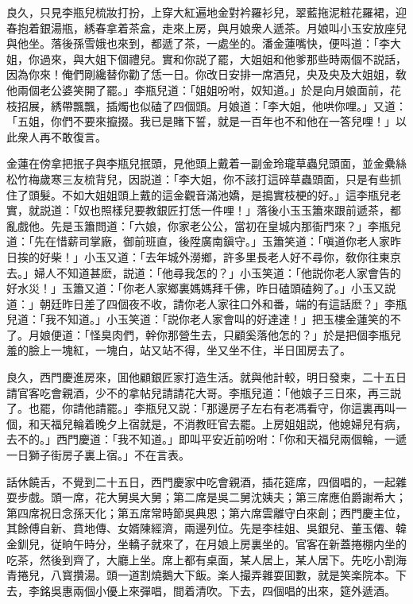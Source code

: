 良久，只見李瓶兒梳妝打扮，上穿大紅遍地金對衿羅衫兒，翠藍拖泥粧花羅裙，迎春抱着銀湯瓶，綉春拿着茶盒，走來上房，與月娘衆人遞茶。月娘叫小玉安放座兒與他坐。落後孫雪娥也來到，都遞了茶，一處坐的。潘金蓮嘴快，便呌道：「李大姐，你過來，與大姐下個禮兒。實和你説了罷，大姐姐和他爹那些時兩個不説話，因為你來！俺們剛纔替你勸了恁一日。你改日安排一席酒兒，央及央及大姐姐，敎他兩個老公婆笑開了罷。」李瓶兒道：「姐姐吩咐，奴知道。」於是向月娘面前，花枝招展，綉帶飄飄，插燭也似磕了四個頭。月娘道：「李大姐，他哄你哩。」又道：「五姐，你們不要來攛掇。我已是賭下誓，就是一百年也不和他在一答兒哩！」以此衆人再不敢復言。

金蓮在傍拿把抿子與李瓶兒抿頭，見他頭上戴着一副金玲瓏草蟲兒頭面，並金纍絲松竹梅歲寒三友梳背兒，因説道：「李大姐，你不該打這碎草蟲頭面，只是有些抓住了頭髮。不如大姐姐頭上戴的這金觀音滿池嬌，是搗實枝梗的好。」這李瓶兒老實，就説道：「奴也照樣兒要教銀匠打恁一件哩！」落後小玉玉簫來跟前遞茶，都亂戲他。先是玉簫問道：「六娘，你家老公公，當初在皇城内那衙門來？」李瓶兒道：「先在惜薪司掌廠，御前班直，後陞廣南鎭守。」玉簫笑道：「嗔道你老人家昨日挨的好柴！」小玉又道：「去年城外澇鄉，許多里長老人好不尋你，敎你往東京去。」婦人不知道甚麽，説道：「他尋我怎的？」小玉笑道：「他説你老人家會告的好水災！」玉簫又道：「你老人家鄉裏媽媽拜千佛，昨日磕頭磕夠了。」小玉又説道：」朝廷昨日差了四個夜不收，請你老人家往口外和番，端的有這話麽？」李瓶兒道：「我不知道。」小玉笑道：「説你老人家會叫的好達達！」把玉樓金蓮笑的不了。月娘便道：「怪臭肉們，幹你那營生去，只顧奚落他怎的？」於是把個李瓶兒羞的臉上一塊紅，一塊白，站又站不得，坐又坐不住，半日囬房去了。

良久，西門慶進房來，囬他顧銀匠家打造生活。就與他計較，明日發柬，二十五日請官客吃會親酒，少不的拿帖兒請請花大哥。李瓶兒道：「他娘子三日來，再三説了。也罷，你請他請罷。」李瓶兒又説：「那邊房子左右有老馮看守，你這裏再叫一個，和天福兒輪着晚夕上宿就是，不消教旺官去罷。上房姐姐説，他媳婦兒有病，去不的。」西門慶道：「我不知道。」即叫平安近前吩咐：「你和天福兒兩個輪，一遞一日獅子街房子裏上宿。」不在言表。

話休饒舌，不覺到二十五日，西門慶家中吃會親酒，插花筵席，四個唱的，一起雜耍步戲。頭一席，花大舅吳大舅；第二席是吳二舅沈姨夫；第三席應伯爵謝希大；第四席祝日念孫天化；第五席常時節吳典恩；第六席雲離守白來創；西門慶主位，其餘傅自新、賁地傳、女婿陳經濟，兩邊列位。先是李桂姐、吳銀兒、董玉僊、韓金釧兒，従晌午時分，坐轎子就來了，在月娘上房裏坐的。官客在新蓋捲棚内坐的吃茶，然後到齊了，大廳上坐。席上都有桌面，某人居上，某人居下。先吃小割海青捲兒，八寳攢湯。頭一道割燒鵝大下飯。楽人撮弄雜耍囬數，就是笑楽院本。下去，李銘吳惠兩個小優上來彈唱，間着清吹。下去，四個唱的出來，筵外遞酒。


